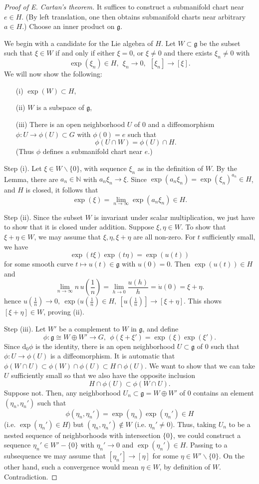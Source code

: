\documentclass{article}
\theoremstyle{remark}
\newcommand{\N}{\mathbb{N}}
\newcommand\lie[1]{\mathfrak{#1}}
\newcommand{\g}{\lie{g}}
\renewcommand{\d}{{\mbox{d}}}
\newcommand{\f}{\frac}
\begin{document}
\begin{proof}[Proof of E. Cartan's theorem]
It suffices to construct a submanifold chart near $e\in H$. (By left 
translation, one then obtains submanifold charts near arbitrary $a\in H$.) 
Choose an inner product on $\g$. 

We begin with a candidate for the Lie algebra of $H$. Let $W\subset
\g$ be the subset such that $\xi\in W$ if and only if either $\xi=0$, or
$\xi\not=0$ and there exists $\xi_n\not=0$ with
%
\[ \exp(\xi_n)\in H,\ \ \xi_n\to 0,\ \ [\xi_n]\to [\xi].\] 
%
We will now show the following: 
\begin{enumerate}
\item[(i)]  $\exp(W)\subset H$,
\item[(ii)] $W$ is a subspace of $\g$,
\item[(iii)] There is an open neighborhood $U$ of $0$ and a diffeomorphism 
$\phi\colon U\to \phi(U)\subset G$ with $\phi(0)=e$ such that 
\[ \phi(U\cap W)=\phi(U)\cap H.\]
(Thus $\phi$ defines a submanifold chart near $e$.) 
\end{enumerate}
Step (i). Let  $\xi\in W\backslash\{0\}$, with  sequence $\xi_n$ as in 
the definition of $W$. By the Lemma, there are $a_n\in\N$ with 
$a_n\xi_n\to \xi$. Since $\exp(a_n\xi_n)=\exp(\xi_n)^{a_n}\in H$, and $H$ is closed, it follows that  
\[ \exp(\xi)=\lim_{n\to \infty} \exp(a_n\xi_n)\in H.\] 

Step (ii). Since the subset $W$ is invariant under scalar
multiplication, we just have to show that it is closed under
addition. Suppose $\xi,\eta\in W$. To show that $\xi+\eta\in W$, we
may assume that $\xi,\eta,\xi+\eta$ are all non-zero.  For $t$
sufficiently small, we have
\[ \exp(t \xi)\exp(t \eta)=\exp(u(t))\] 
for some smooth curve 
$t\mapsto u(t)\in\g$ with $u(0)=0$.  Then $\exp(u(t))\in H$ and 
\[ \lim_{n\to \infty} n\, u(\f{1}{n})=
\lim_{h\to 0} \f{u(h)}{h}=\dot{u}(0)=\xi+\eta.\]
hence $u(\f{1}{n})\to 0,\ \exp(u(\f{1}{n})\in H,\  
[u(\f{1}{n})]\to [\xi+\eta]$. This shows $[\xi+\eta]\in W$, 
proving (ii). 

Step (iii). Let $W'$ be a complement to $W$ in $\g$, and define 
\[ \phi\colon \g\cong W\oplus W'\to G,\ \ \phi(\xi+\xi')=\exp(\xi)
\exp(\xi').\]
%
Since $\d_0\phi$ is the identity, there is an open neighborhood
$U\subset\g$ of $0$ such that $\phi\colon U\to \phi(U)$ is a
diffeomorphism.  It is automatic that $\phi(W\cap U)\subset
\phi(W)\cap \phi(U)\subset H\cap \phi(U)$. We want to show that we can
take $U$ sufficiently small so that we also have the opposite
inclusion
% 
\[  H\cap \phi(U)\subset \phi(W\cap U).\]
%
Suppose not. Then, any neighborhood $U_n\subset \g=W\oplus W'$
of $0$ contains an element $(\eta_n,\eta_n')$ such that 
\[ \phi(\eta_n,\eta_n')=\exp(\eta_n)\exp(\eta_n')\in H\] 
(i.e. $\exp(\eta_n')\in H$) but $(\eta_n,\eta_n')\not\in W$ (i.e. 
$\eta_n'\not=0$). Thus, taking $U_n$ to be a nested sequence
of neighborhoods with intersection $\{0\}$,  we could construct a sequence 
$\eta_n'\in W'-\{0\}$ with $\eta_n'\to 0$ 
and $\exp(\eta_n')\in H$. Passing to a subsequence we may assume that 
$[\eta_n']\to [\eta]$ for some $\eta\in W'\backslash \{0\}$. On the 
other hand, such a convergence would mean $\eta\in W$, by definition of $W$. 
Contradiction. 
\end{proof}
\end{document}
